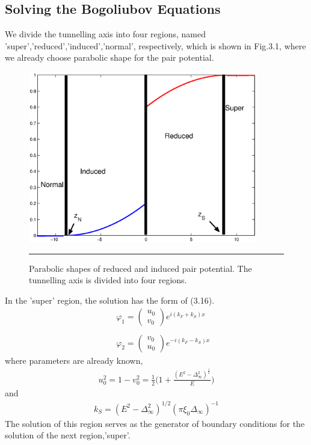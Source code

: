 \subsection{Solving the Bogoliubov Equations}
We divide the tunnelling axis into four regions, named 'super','reduced','induced','normal', respectively, which is shown in Fig.3.1, where we already choose parabolic shape for the pair potential.
\begin{figure}[htbp]
\small
	\centering
		\includegraphics[width=10cm]{./Figures/3-2-1.eps}
		\rule{35em}{0.5pt}
	\caption[An Electron]{Parabolic shapes of reduced and induced pair potential. The tunnelling axis is divided into four regions.}
	\label{fig:Electron}
\end{figure}
In the 'super' region, the solution has the form of (3.16).
\begin{eqnarray}
&&\varphi_1=
\left(
\begin{array}{c}
 u_0\\
 v_0
 \end{array}\right)e^{i(k_F+k_S)x}\nonumber\\
&&\\
&&\varphi_2=
\left(
\begin{array}{c}
 v_0\\
 u_0
 \end{array}\right)e^{-i(k_F-k_S)x}\nonumber
\end{eqnarray}
where parameters are already known,
\begin{eqnarray}
u_0^2=1-v_0^2=\frac{1}{2}\Big(1+\frac{(E^2-\Delta_{\infty}^2)^{\frac{1}{2}}}{E}\Big)
\end{eqnarray}
and 
\begin{eqnarray}
k_S=(E^2-\Delta_{\infty}^2)^{1/2}(\pi \xi_0 \Delta_{\infty})^{-1}
\end{eqnarray}
The solution of this region serves as the generator of boundary conditions for the solution of the next region,'super'.

